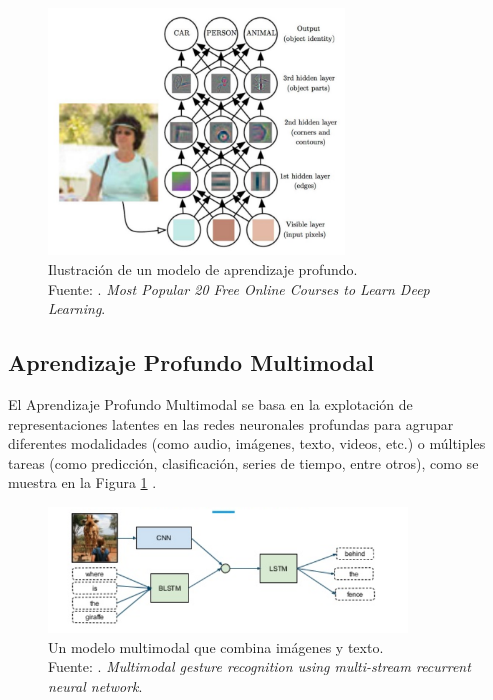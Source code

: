\begin{figure}[!ht]
	\begin{center}
		\includegraphics[width=0.70\textwidth]{2/figures/deeplearning_machinelearning2.jpg}
		\caption[Ilustración de un modelo de aprendizaje profundo]{Ilustración de un modelo de aprendizaje profundo.\\
		Fuente: \cite{tec_cook2018deeplearning}. \textit{Most Popular 20 Free Online Courses to Learn Deep Learning}.}
		\label{2:fig6}
	\end{center}
\end{figure}


\subsection{Aprendizaje Profundo Multimodal}
El Aprendizaje Profundo Multimodal se basa en la explotación de representaciones latentes en las redes neuronales profundas para agrupar diferentes modalidades (como audio, imágenes, texto, videos, etc.) o múltiples tareas (como predicción, clasificación, series de tiempo, entre otros), como se muestra en la Figura \ref{2:fig6} \parencite{bk_deng2018deeplearningnlp}.

\begin{figure}[!ht]
	\begin{center}
		\includegraphics[width=0.85\textwidth]{2/figures/multimodal_network.png}
		\caption[Un modelo multimodal que combina imágenes y texto]{Un modelo multimodal que combina imágenes y texto.\\
		Fuente: \cite{tec_nishida2015multimodal}. \textit{Multimodal gesture recognition using multi-stream recurrent neural network}.}
		\label{2:fig7}
	\end{center}
\end{figure}

